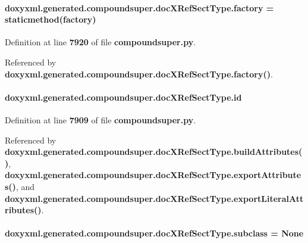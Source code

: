 \paragraph[{factory}]{\setlength{\rightskip}{0pt plus 5cm}doxyxml.\+generated.\+compoundsuper.\+doc\+X\+Ref\+Sect\+Type.\+factory = staticmethod(factory)\hspace{0.3cm}{\ttfamily [static]}}\label{classdoxyxml_1_1generated_1_1compoundsuper_1_1docXRefSectType_ad38ffb17a868224475cfc86022a62f12}


Definition at line {\bf 7920} of file {\bf compoundsuper.\+py}.



Referenced by {\bf doxyxml.\+generated.\+compoundsuper.\+doc\+X\+Ref\+Sect\+Type.\+factory()}.

\paragraph[{id}]{\setlength{\rightskip}{0pt plus 5cm}doxyxml.\+generated.\+compoundsuper.\+doc\+X\+Ref\+Sect\+Type.\+id}\label{classdoxyxml_1_1generated_1_1compoundsuper_1_1docXRefSectType_ab088102407d9c0530241e3f1d436e7e3}


Definition at line {\bf 7909} of file {\bf compoundsuper.\+py}.



Referenced by {\bf doxyxml.\+generated.\+compoundsuper.\+doc\+X\+Ref\+Sect\+Type.\+build\+Attributes()}, {\bf doxyxml.\+generated.\+compoundsuper.\+doc\+X\+Ref\+Sect\+Type.\+export\+Attributes()}, and {\bf doxyxml.\+generated.\+compoundsuper.\+doc\+X\+Ref\+Sect\+Type.\+export\+Literal\+Attributes()}.

\paragraph[{subclass}]{\setlength{\rightskip}{0pt plus 5cm}doxyxml.\+generated.\+compoundsuper.\+doc\+X\+Ref\+Sect\+Type.\+subclass = None\hspace{0.3cm}{\ttfamily [static]}}\label{classdoxyxml_1_1generated_1_1compoundsuper_1_1docXRefSectType_a6a3e0054bdf1c5a052f94738925094a7}


